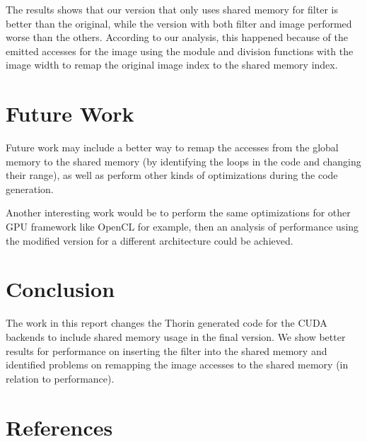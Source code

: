 \documentclass{article}
\begin{document}
The results shows that our version that only uses shared memory for filter is better than the original, while the version with both filter and image performed worse than the others. According to our analysis, this happened because of the emitted accesses for the image using the module and division functions with the image width to remap the original image index to the shared memory index.

\section{Future Work}
Future work may include a better way to remap the accesses from the global memory to the shared memory (by identifying the loops in the code and changing their range), as well as perform other kinds of optimizations during the code generation.

Another interesting work would be to perform the same optimizations for other GPU framework like OpenCL for example, then an analysis of performance using the modified version for a different architecture could be achieved.

\section{Conclusion}
The work in this report changes the Thorin generated code for the CUDA backends to include shared memory usage in the final version. We show better results for performance on inserting the filter into the shared memory and identified problems on remapping the image accesses to the shared memory (in relation to performance).

\section{References}
\end{document}
